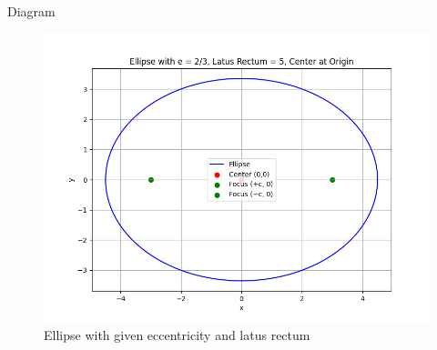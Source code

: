 \documentclass{beamer}
\begin{document}
\begin{frame}{Diagram}
\begin{figure}[h!]
\centering
\includegraphics[width=0.9\linewidth]{Figs/Fig1.png}
\caption{Ellipse with given eccentricity and latus rectum}
\end{figure}
\end{frame}
\end{document}
